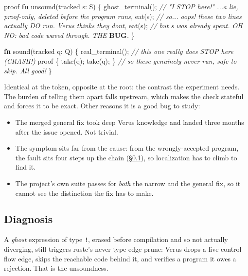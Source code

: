 \documentclass[
  10pt,
]{article}
\newenvironment{Shaded}{}{}
\newcommand{\AlertTok}[1]{\textcolor[rgb]{1.00,0.00,0.00}{\textbf{#1}}}
\newcommand{\CommentTok}[1]{\textcolor[rgb]{0.38,0.63,0.69}{\textit{#1}}}
\newcommand{\KeywordTok}[1]{\textcolor[rgb]{0.00,0.44,0.13}{\textbf{#1}}}
\newcommand{\NormalTok}[1]{#1}
\newcommand{\OperatorTok}[1]{\textcolor[rgb]{0.40,0.40,0.40}{#1}}
\providecommand{\tightlist}{%
  \setlength{\itemsep}{0pt}\setlength{\parskip}{0pt}}
\begin{document}
\begin{Shaded}
\begin{Highlighting}[]
\NormalTok{proof }\KeywordTok{fn}\NormalTok{ unsound(tracked s}\OperatorTok{:}\NormalTok{ S) }\OperatorTok{\{}
\NormalTok{    ghost\_terminal()}\OperatorTok{;}  \CommentTok{// "I STOP here!" ...a lie, proof{-}only, deleted before the program runs,}
\NormalTok{    eat(s)}\OperatorTok{;}            \CommentTok{// so... oops! these two lines actually DO run. Verus thinks they don\textquotesingle{}t,}
\NormalTok{    eat(s)}\OperatorTok{;}            \CommentTok{// but \textasciigrave{}s\textasciigrave{} was already spent. OH NO: bad code waved through. THE }\AlertTok{BUG}\CommentTok{.}
\OperatorTok{\}}

\KeywordTok{fn}\NormalTok{ sound(tracked q}\OperatorTok{:}\NormalTok{ Q) }\OperatorTok{\{}
\NormalTok{    real\_terminal()}\OperatorTok{;}             \CommentTok{// this one really does STOP here (CRASH!)}
\NormalTok{    proof }\OperatorTok{\{}\NormalTok{ take(q)}\OperatorTok{;}\NormalTok{ take(q)}\OperatorTok{;} \OperatorTok{\}}  \CommentTok{// so these genuinely never run, safe to skip. All good!}
\OperatorTok{\}}
\end{Highlighting}
\end{Shaded}

Identical at the token, opposite at the root: the contrast the
experiment needs. The burden of telling them apart falls upstream, which
makes the check stateful and forces it to be exact. Other reasons it is
a good bug to study:

\begin{itemize}
\tightlist
\item
  The merged general fix took deep Verus knowledge and landed three
  months after the issue opened. Not trivial.
\item
  The symptom sits far from the cause: from the wrongly-accepted
  program, the fault sits four steps up the chain (\S\ref{verus-bug}),
  so localization has to climb to find it.
\item
  The project's own suite passes for \emph{both} the narrow and the
  general fix, so it cannot see the distinction the fix has to make.
\end{itemize}

\subsection{Diagnosis}\label{verus-bug}

A \emph{ghost} expression of type \texttt{!}, erased before compilation
and so not actually diverging, still triggers rustc's never-type edge
prune: Verus drops a live control-flow edge, skips the reachable code
behind it, and verifies a program it owes a rejection. That is the
unsoundness.
\end{document}
